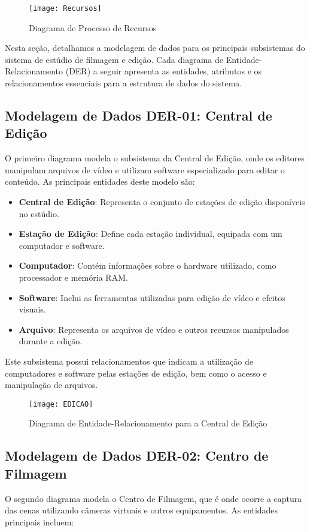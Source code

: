 \begin{figure}[ht]
    \centering
    \texttt{[image: Recursos]}
    \caption{Diagrama de Processo de Recursos}
    \label{fig:diagram1}
\end{figure}

\pagebreak
\newpage

Nesta seção, detalhamos a modelagem de dados para os principais subsistemas do sistema de estúdio de filmagem e edição. Cada diagrama de Entidade-Relacionamento (DER) a seguir apresenta as entidades, atributos e os relacionamentos essenciais para a estrutura de dados do sistema.

\subsection{Modelagem de Dados DER-01: Central de Edição}
O primeiro diagrama modela o subsistema da Central de Edição, onde os editores manipulam arquivos de vídeo e utilizam software especializado para editar o conteúdo. As principais entidades deste modelo são:

\begin{itemize}
    \item \textbf{Central de Edição}: Representa o conjunto de estações de edição disponíveis no estúdio.
    \item \textbf{Estação de Edição}: Define cada estação individual, equipada com um computador e software.
    \item \textbf{Computador}: Contém informações sobre o hardware utilizado, como processador e memória RAM.
    \item \textbf{Software}: Inclui as ferramentas utilizadas para edição de vídeo e efeitos visuais.
    \item \textbf{Arquivo}: Representa os arquivos de vídeo e outros recursos manipulados durante a edição.
\end{itemize}

Este subsistema possui relacionamentos que indicam a utilização de computadores e software pelas estações de edição, bem como o acesso e manipulação de arquivos.

\begin{figure}[ht]
    \centering
    \texttt{[image: EDICAO]}
    \caption{Diagrama de Entidade-Relacionamento para a Central de Edição}
    \label{fig:edicao}
\end{figure}

\subsection{Modelagem de Dados DER-02: Centro de Filmagem}
O segundo diagrama modela o Centro de Filmagem, que é onde ocorre a captura das cenas utilizando câmeras virtuais e outros equipamentos. As entidades principais incluem:

